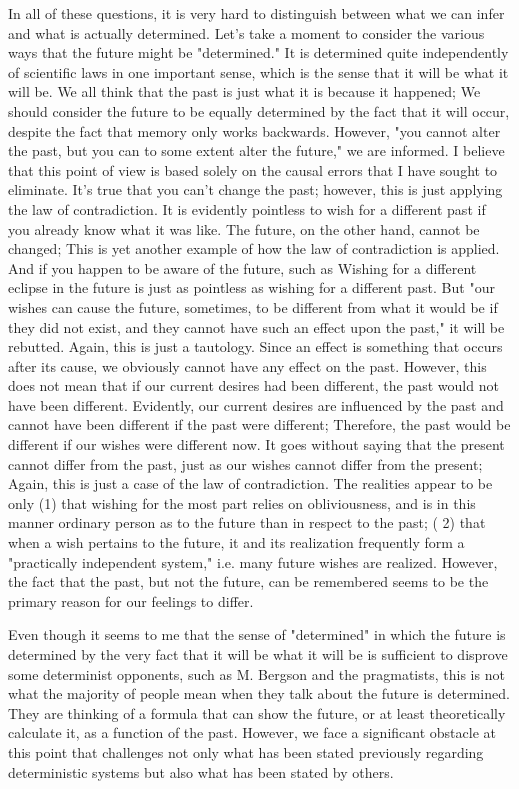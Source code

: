 \documentclass[a4paper,12pt]{book}[2004/02/16]
\theoremstyle{ilemma}
\theoremstyle{itheorem}
\theoremstyle{iother}
\theoremstyle{icorollary}
\theoremstyle{numcorollary}
\theoremstyle{idefinition}
\begin{document}
In all of these questions, it is very hard to distinguish between what we can infer and what is actually determined.
Let's take a moment to consider the various ways that the future might be "determined." It is determined quite independently of scientific laws in one important sense, which is the sense that it will be what it will be. We all think that the past is just what it is because it happened; We should consider the future to be equally determined by the fact that it will occur, despite the fact that memory only works backwards.
However, "you cannot alter the past, but you can to some extent alter the future," we are informed. I believe that this point of view is based solely on the causal errors that I have sought to eliminate. It's true that you can't change the past; however, this is just applying the law of contradiction. It is evidently pointless to wish for a different past if you already know what it was like. The future, on the other hand, cannot be changed; This is yet another example of how the law of contradiction is applied. And if you happen to be aware of the future, such as Wishing for a different eclipse in the future is just as pointless as wishing for a different past. But "our wishes can cause the future, sometimes, to be different from what it would be if they did not exist, and they cannot have such an effect upon the past," it will be rebutted. Again, this is just a tautology.
Since an effect is something that occurs after its cause, we obviously cannot have any effect on the past. However, this does not mean that if our current desires had been different, the past would not have been different. Evidently, our current desires are influenced by the past and cannot have been different if the past were different; Therefore, the past would be different if our wishes were different now. It goes without saying that the present cannot differ from the past, just as our wishes cannot differ from the present; Again, this is just a case of the law of contradiction. The
realities appear to be only (1) that wishing for the most part relies on
obliviousness, and is in this manner ordinary person as to the future than in
respect to the past; ( 2) that when a wish pertains to the future, it and its realization frequently form a "practically independent system," i.e. many future wishes are realized. However, the fact that the past, but not the future, can be remembered seems to be the primary reason for our feelings to differ.

Even though it seems to me that the sense of "determined" in which the future is determined by the very fact that it will be what it will be is sufficient to disprove some determinist opponents, such as M. Bergson and the pragmatists, this is not what the majority of people mean when they talk about the future is determined. They are thinking of a formula that can show the future, or at least theoretically calculate it, as a function of the past. However, we face a significant obstacle at this point that challenges not only what has been stated previously regarding deterministic systems but also what has been stated by others.
\end{document}
